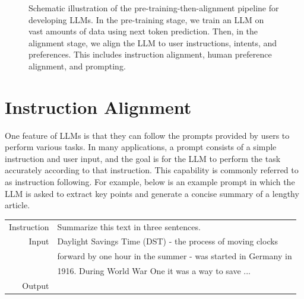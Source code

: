 \begin{figure}[!t]
\centering

\caption{Schematic illustration of the pre-training-then-alignment pipeline for developing LLMs. In the pre-training stage, we train an LLM on vast amounts of data using next token prediction. Then, in the alignment stage, we align the LLM to user instructions, intents, and preferences. This includes instruction alignment, human preference alignment, and prompting.}
\label{fig:pre-training-then-alignment}
\end{figure}


\section{Instruction Alignment}

\noindent One feature of LLMs is that they can follow the prompts provided by users to perform various tasks. In many applications, a prompt consists of a simple instruction and user input, and the goal is for the LLM to perform the task accurately according to that instruction. This capability is commonly referred to as instruction following. For example, below is an example prompt in which the LLM is asked to extract key points and generate a concise summary of a lengthy article.

\vspace{0.5em}
\begin{tcolorbox}

\begingroup
\renewcommand{\arraystretch}{1.0}
\setlength{\tabcolsep}{6pt}
\begin{tabular}{r l}
{\color{gray} \small{Instruction}} & Summarize this text in three sentences. \\ [0.2cm]
{\color{gray} \small{Input}} & Daylight Savings Time (DST) - the process of moving clocks \\
& forward by one hour in the summer - was started in Germany in \\
& 1916. During World War One it was a way to save ... \\ [0.2cm]
{\color{gray} \small{Output}} & \underline{\hspace{2em}}
\end{tabular}
\endgroup

\end{tcolorbox}
\vspace{0.5em}

